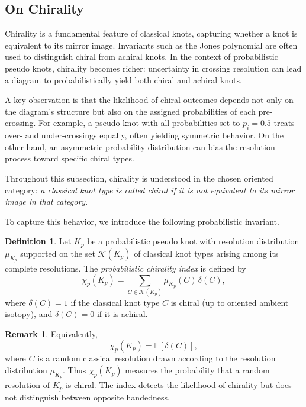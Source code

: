 \documentclass[a4paper, reqno, 12pt]{amsart}
\theoremstyle{plain}
\theoremstyle{definition}
\newtheorem{definition}[theorem]{Definition}
\newtheorem{remark}[theorem]{Remark}
\begin{document}
\subsection{On Chirality}\label{sec:chirality}

Chirality is a fundamental feature of classical knots, capturing whether a knot is equivalent to its mirror image. Invariants such as the Jones polynomial are often used to distinguish chiral from achiral knots. In the context of probabilistic pseudo knots, chirality becomes richer: uncertainty in crossing resolution can lead a diagram to probabilistically yield both chiral and achiral knots.

A key observation is that the likelihood of chiral outcomes depends not only on the diagram's structure but also on the assigned probabilities of each pre-crossing. For example, a pseudo knot with all probabilities set to \( p_i = 0.5 \) treats over- and under-crossings equally, often yielding symmetric behavior. On the other hand, an asymmetric probability distribution can bias the resolution process toward specific chiral types.

Throughout this subsection, chirality is understood in the chosen oriented category: {\it a classical knot type is called chiral if it is not equivalent to its mirror image in that category}. 

To capture this behavior, we introduce the following probabilistic invariant.


\begin{definition}\rm
Let \( K_p \) be a probabilistic pseudo knot with resolution distribution \( \mu_{K_p} \) supported on the set \( \mathcal{K}(K_p) \) of classical knot types arising among its complete resolutions. The \emph{probabilistic chirality index} is defined by
\[
\chi_p(K_p)
=
\sum_{C \in \mathcal{K}(K_p)}
\mu_{K_p}(C)\,\delta(C),
\]
where \( \delta(C)=1 \) if the classical knot type \( C \) is chiral (up to oriented ambient isotopy), and \( \delta(C)=0 \) if it is achiral.
\end{definition}



\begin{remark}\rm
Equivalently,
\[
\chi_p(K_p)=\mathbb{E}[\delta(C)],
\]
where \( C \) is a random classical resolution drawn according to the resolution distribution \( \mu_{K_p} \). Thus \( \chi_p(K_p) \) measures the probability that a random resolution of \( K_p \) is chiral. The index detects the likelihood of chirality but does not distinguish between opposite handedness.
\end{remark}
\end{document}
